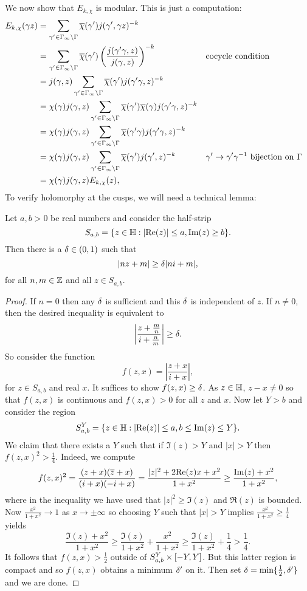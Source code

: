       We now show that $E_{k,\chi}$ is modular. This is just a computation:
      \begin{align*}
        E_{k,\chi}(\gamma z) &= \sum_{\gamma' \in \Gamma_{\infty}\backslash\Gamma}\overline{\chi}(\gamma')j(\gamma',\gamma z)^{-k} \\
        &= \sum_{\gamma' \in \Gamma_{\infty}\backslash\Gamma}\overline{\chi}(\gamma')\left(\frac{j(\gamma'\gamma,z)}{j(\gamma,z)}\right)^{-k} && \text{cocycle condition} \\
        &= j(\gamma,z)\sum_{\gamma' \in \Gamma_{\infty}\backslash\Gamma}\overline{\chi}(\gamma')j(\gamma'\gamma,z)^{-k} \\
        &= \chi(\gamma)j(\gamma,z)\sum_{\gamma' \in \Gamma_{\infty}\backslash\Gamma}\overline{\chi}(\gamma')\overline{\chi}(\gamma)j(\gamma'\gamma,z)^{-k} \\
        &= \chi(\gamma)j(\gamma,z)\sum_{\gamma' \in \Gamma_{\infty}\backslash\Gamma}\overline{\chi}(\gamma'\gamma)j(\gamma'\gamma,z)^{-k} \\
        &= \chi(\gamma)j(\gamma,z)\sum_{\gamma' \in \Gamma_{\infty}\backslash\Gamma}\overline{\chi}(\gamma')j(\gamma',z)^{-k} && \text{$\gamma' \to \gamma'\gamma^{-1}$ bijection on $\Gamma$} \\
        &= \chi(\gamma)j(\gamma,z)E_{k,\chi}(z),
      \end{align*}
      To verify holomorphy at the cusps, we will need a technical lemma:

      \begin{lemma}\label{lem:technical_Eisenstein_convergence_lemma}
        Let $a,b > 0$ be real numbers and consider the half-strip
        \[
          S_{a,b} = \{z \in \mathbb{H}:|\mathrm{Re}(z)| \le a, \mathrm{Im}(z) \ge b\}.
        \]
        Then there is a $\delta \in (0,1)$ such that
        \[
          |nz+m| \ge \delta|ni+m|,
        \]
        for all $n,m \in \mathbb{Z}$ and all $z \in S_{a,b}$.
      \end{lemma}
      \begin{proof}
        If $n = 0$ then any $\delta$ is sufficient and this $\delta$ is independent of $z$. If $n \neq 0$, then the desired inequality is equivalent to
        \[
          \left|\frac{z+\frac{m}{n}}{i+\frac{n}{m}}\right| \ge \delta.
        \]
        So consider the function
        \[
          f(z,x) = \left|\frac{z+x}{i+x}\right|,
        \]
        for $z \in S_{a,b}$ and real $x$. It suffices to show $f(z,x) \ge \delta$. As $z \in \mathbb{H}$, $z-x \neq 0$ so that $f(z,x)$ is continuous and $f(z,x) > 0$ for all $z$ and $x$. Now let $Y > b$ and consider the region
        \[
          S_{a,b}^{Y} = \{z \in \mathbb{H}:|\mathrm{Re}(z)| \le a, b \le \mathrm{Im}(z) \le Y\}.
        \]
        We claim that there exists a $Y$ such that if $\Im(z) > Y$ and $|x| > Y$ then $f(z,x)^{2} > \frac{1}{4}$. Indeed, we compute
        \[
          f(z,x)^{2} = \frac{(z+x)(\overline{z}+x)}{(i+x)(-i+x)} = \frac{|z|^{2}+2\mathrm{Re}(z)x+x^{2}}{1+x^{2}} \ge \frac{\mathrm{Im}(z)+x^{2}}{1+x^{2}},
        \]
        where in the inequality we have used that $|z|^{2} \ge \Im(z)$ and $\Re(z)$ is bounded. Now $\frac{x^{2}}{1+x^{2}} \to 1$ as $x \to \pm\infty$ so choosing $Y$ such that $|x| > Y$ implies $\frac{x^{2}}{1+x^{2}} \ge \frac{1}{4}$ yields
        \[
          \frac{\Im(z)+x^{2}}{1+x^{2}} \ge \frac{\Im(z)}{1+x^{2}}+\frac{x^{2}}{1+x^{2}} \ge \frac{\Im(z)}{1+x^{2}}+\frac{1}{4} > \frac{1}{4}.
        \]
        It follows that $f(z,x) > \frac{1}{2}$ outside of $S_{a,b}^{Y} \times [-Y,Y]$. But this latter region is compact and so $f(z,x)$ obtains a minimum $\delta'$ on it. Then set $\delta = \min\{\frac{1}{2},\delta'\}$ and we are done.
      \end{proof}

